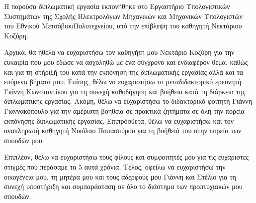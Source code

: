 
\author{Θάλεια-Δήμητρα Δούδαλη}
\date{Ιούλιος 2015}

\begin{acknowledgementsgr}
 
 Η παρούσα διπλωματική εργασία εκπονήθηκε στο Εργαστήριο Υπολογιστικών Συστημάτων της Σχολής Ηλεκτρολόγων Μηχανικών και Μηχανικών Υπολογιστών του 
 Εθνικού Μετσόβιου\linebreak  Πολυτεχνείου, υπό την επίβλεψη του καθηγητή Νεκτάριου Κοζύρη. 
 
 Αρχικά, θα ήθελα να ευχαριστήσω τον καθηγήτη μου Νεκτάριο Κοζύρη για την ευκαιρία που μου έδωσε να ασχοληθώ με ένα σύγχρονο και ενδιαφέρον θέμα, καθώς και 
 για τη στήριξή του κατά την εκπόνηση της διπλωματικής εργασίας αλλά και τα επόμενα βήματά μου. Επίσης, θέλω να ευχαριστήσω το μεταδιδακτορικό ερευνητή 
 Γιάννη Κωνσταντίνου για τη συνεχή καθοδήγηση και βοήθεια κατά τη διάρκεια της διπλωματικής εργασίας. Ακόμη, θέλω να ευχαριστήσω το 
 διδακτορικό φοιτητή Γιάννη Γιαννακόπουλο για την αμέριστη βοήθεια σε πρακτικά ζητήματα σε όλη την πορεία εκπόνησης διπλωματικής εργασίας. 
 Επιπρόσθετα, θέλω να ευχαριστήσω και τον αναπληρωτή καθηγητή Νικόλαο Παπασπύρου για τη βοήθειά του στην πορεία των σπουδών μου. 
 
 Επιπλέον, θελω να ευχαριστήσω τους φίλους και συμφοιτητές μου για τις ευχάριστες στιγμές που περάσαμε τα 5 αυτά χρόνια. 
 Τέλος, οφείλω να ευχαριστήσω την οικογένεια μου, τη μητέρα μου και τους αδερφούς μου Γιάννη και Στέλιο για τη συνεχή υποστήριξη και 
 συμπαράσταση σε όλο το διάστημα των προπτυχιακών μου σπουδών. 
 
\end{acknowledgementsgr}
